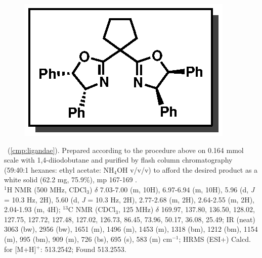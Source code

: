 \vspace{10pt}
\begin{figure}
  \vspace{-25pt}
  \begin{center}
    \includegraphics[scale=0.8]{chp_asymmetric/images/ligandae}
  \end{center}
  \vspace{-35pt}
\end{figure}
\noindent \textbf{\CMPligandae}\ (\ref{cmp:ligandae}). Prepared according to the procedure above on
0.164 mmol scale with 1,4-diiodobutane and purified by flash column chromatography (59:40:1 hexanes:
ethyl acetate: NH$_4$OH v/v/v) to afford the desired product as a white solid (62.2 mg, 75.9\%), mp
167-169 \degc.\\
$^1$H NMR (500 MHz, CDCl$_3$) $\delta$ 7.03-7.00 (m, 10H), 6.97-6.94 (m, 10H), 5.96 (d, \textit{J} =
10.3 Hz, 2H), 5.60 (d, \textit{J} = 10.3 Hz, 2H), 2.77-2.68 (m, 2H), 2.64-2.55 (m, 2H), 2.04-1.93
(m, 4H); $^{13}$C NMR (CDCl$_3$, 125 MHz) $\delta$ 169.97, 137.80, 136.50, 128.02, 127.75, 127.72,
127.48, 127.02, 126.73, 86.45, 73.96, 50.17, 36.08, 25.49; IR (neat) 3063 (bw), 2956 (bw), 1651 (m),
1496 (m), 1453 (m), 1318 (bm), 1212 (bm), 1154 (m), 995 (bm), 909 (m), 726 (bs), 695 (s), 583 (m)
cm$^{-1}$; HRMS (ESI+) Calcd. for  [M+H]$^+$: 513.2542; Found 513.2553.

